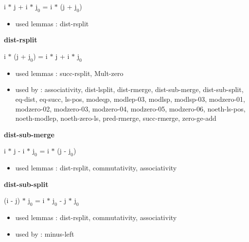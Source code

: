 \documentclass[a4paper]{article}
\begin{document}
\medskip

 \Fol i $*$ j + i $*$ $\mbox{j}_{0}$ = i $*$ (j + $\mbox{j}_{0}$)

\begin{itemize}


\item       used lemmas  : dist-rsplit

\end{itemize}

\medskip

\bigskip

{\large\bf dist-rsplit}

\medskip

 \Fol i $*$ (j + $\mbox{j}_{0}$) = i $*$ j + i $*$ $\mbox{j}_{0}$

\begin{itemize}


\item       used lemmas  : succ-rsplit, Mult-zero
\item       used by      : associativity, dist-lsplit, dist-rmerge, dist-sub-merge, dist-sub-split, eq-dist, eq-succ, ls-pos, modeqp, modlep-03, modlsp, modlsp-03, modzero-01, modzero-02, modzero-03, modzero-04, modzero-05, modzero-06, noeth-ls-pos, noeth-modlep, noeth-zero-ls, pred-rmerge, succ-rmerge, zero-ge-add

\end{itemize}

\medskip

\bigskip

{\large\bf dist-sub-merge}

\medskip

 \Fol i $*$ j - i $*$ $\mbox{j}_{0}$ = i $*$ (j - $\mbox{j}_{0}$)

\begin{itemize}


\item       used lemmas  : dist-rsplit, commutativity, associativity

\end{itemize}

\medskip

\bigskip

{\large\bf dist-sub-split}

\medskip

 \Fol (i - j) $*$ $\mbox{j}_{0}$ = i $*$ $\mbox{j}_{0}$ - j $*$ $\mbox{j}_{0}$

\begin{itemize}


\item       used lemmas  : dist-rsplit, commutativity, associativity
\item       used by      : minus-left

\end{itemize}
\end{document}
